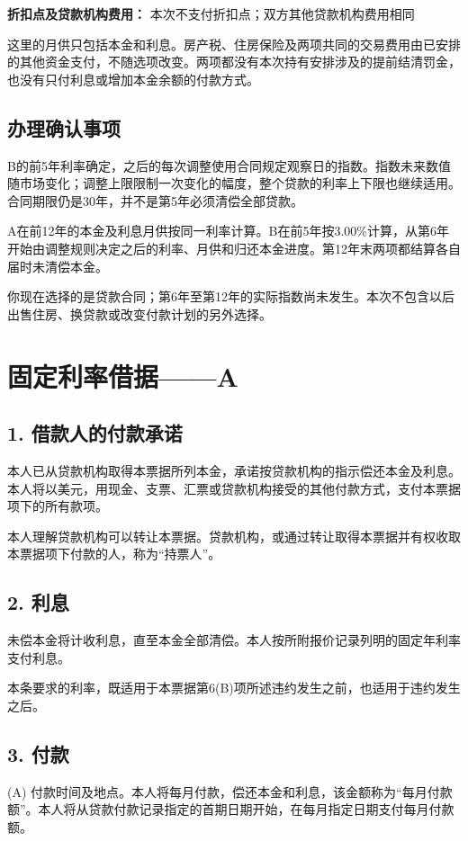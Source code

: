 \documentclass[UTF8,fontset=none,11pt,a4paper]{ctexart}
\begin{document}
\textbf{折扣点及贷款机构费用：} 本次不支付折扣点；双方其他贷款机构费用相同


这里的月供只包括本金和利息。房产税、住房保险及两项共同的交易费用由已安排的其他资金支付，不随选项改变。两项都没有本次持有安排涉及的提前结清罚金，也没有只付利息或增加本金余额的付款方式。


\subsection*{办理确认事项}
B的前5年利率确定，之后的每次调整使用合同规定观察日的指数。指数未来数值随市场变化；调整上限限制一次变化的幅度，整个贷款的利率上下限也继续适用。合同期限仍是30年，并不是第5年必须清偿全部贷款。


A在前12年的本金及利息月供按同一利率计算。B在前5年按3.00\%计算，从第6年开始由调整规则决定之后的利率、月供和归还本金进度。第12年末两项都结算各自届时未清偿本金。


你现在选择的是贷款合同；第6年至第12年的实际指数尚未发生。本次不包含以后出售住房、换贷款或改变付款计划的另外选择。


\section*{固定利率借据——A}
\subsection*{1. 借款人的付款承诺}
本人已从贷款机构取得本票据所列本金，承诺按贷款机构的指示偿还本金及利息。本人将以美元，用现金、支票、汇票或贷款机构接受的其他付款方式，支付本票据项下的所有款项。


本人理解贷款机构可以转让本票据。贷款机构，或通过转让取得本票据并有权收取本票据项下付款的人，称为“持票人”。


\subsection*{2. 利息}
未偿本金将计收利息，直至本金全部清偿。本人按所附报价记录列明的固定年利率支付利息。


本条要求的利率，既适用于本票据第6(B)项所述违约发生之前，也适用于违约发生之后。


\subsection*{3. 付款}
(A) 付款时间及地点。本人将每月付款，偿还本金和利息，该金额称为“每月付款额”。本人将从贷款付款记录指定的首期日期开始，在每月指定日期支付每月付款额。
\end{document}
